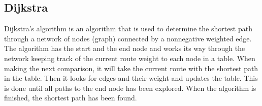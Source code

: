 \subsection{Dijkstra}
Dijkstra's algorithm is an algorithm that is used to determine the shortest path through a network of nodes (graph) connected by a nonnegative weighted edge. The algorithm has the start and the end node and works its way through the network keeping track of the current route weight to each node in a table. When making the next comparison, it will take the current route with the shortest path in the table. Then it looks for edges and their weight and updates the table. This is done until all paths to the end node has been explored. When the algorithm is finished, the shortest path has been found.